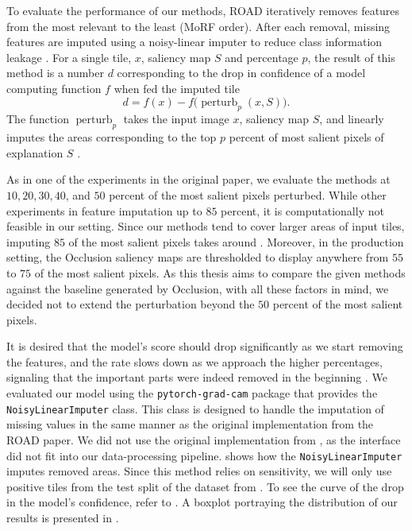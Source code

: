 To evaluate the performance of our methods, ROAD iteratively removes features from the most relevant to the least (MoRF order).
After each removal, missing features are imputed using a noisy-linear imputer to reduce class information leakage \cite{road}.
For a single tile, $x$, saliency map $S$ and percentage $p$, the result of this method is a number $d$ corresponding to the drop in confidence of a model computing function $f$ when fed the imputed tile
\begin{equation}
    d = f(x) - f\bigl(\operatorname{perturb}_p(x, S)\bigr).
\end{equation}
The function $\operatorname{perturb}_p$ takes the input image $x$, saliency map $S$, and linearly imputes the areas corresponding to the top $p$ percent of most salient pixels of explanation $S$ \cite{road}.

As in one of the experiments in the original paper, we evaluate the methods at $10, 20, 30, 40$, and $50$ percent of the most salient pixels perturbed.
While other experiments in \cite{road} feature imputation up to $85$ percent, it is computationally not feasible in our setting.
Since our methods tend to cover larger areas of input tiles, imputing $85$ of the most salient pixels takes around .
Moreover, in the production setting, the Occlusion saliency maps are thresholded to display anywhere from $55$ to $75$ of the most salient pixels.
As this thesis aims to compare the given methods against the baseline generated by Occlusion, with all these factors in mind, we decided not to extend the perturbation beyond the $50$ percent of the most salient pixels.

It is desired that the model's score should drop significantly as we start removing the features, and the rate slows down as we approach the higher percentages, signaling that the important parts were indeed removed in the beginning \cite{road}.
We evaluated our model using the \texttt{pytorch-grad-cam} package that provides the \texttt{NoisyLinearImputer} class.
This class is designed to handle the imputation of missing values in the same manner as the original implementation from the ROAD paper.
We did not use the original implementation from \cite{road}, as the interface did not fit into our data-processing pipeline.
 shows how the \texttt{NoisyLinearImputer} imputes removed areas.
Since this method relies on sensitivity, we will only use positive tiles from the test split of the dataset from .
To see the curve of the drop in the model's confidence, refer to .
A boxplot portraying the distribution of our results is presented in .

